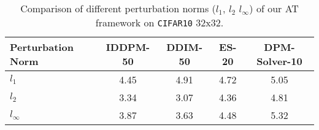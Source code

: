 
\begin{table*}[t!]
\centering
\caption{Comparison of different perturbation norms ($l_1$, $l_2$ $l_{\infty}$) of our AT framework on \texttt{CIFAR10} 32x32.}
\begin{tabular}{lcccc}
\toprule
   Perturbation Norm & IDDPM-50 & DDIM-50 & ES-20 & DPM-Solver-10 \\ 
    \midrule
    $l_1$ & 4.45 & 4.91 & 4.72 & 5.05 \\
    $l_2$ & 3.34 & 3.07 & 4.36 & 4.81 \\
    $l_{\infty}$ & 3.87 & 3.63 & 4.48 & 5.32 \\
    \bottomrule
    \end{tabular}
\label{tab:norm_ablation}
\end{table*}

